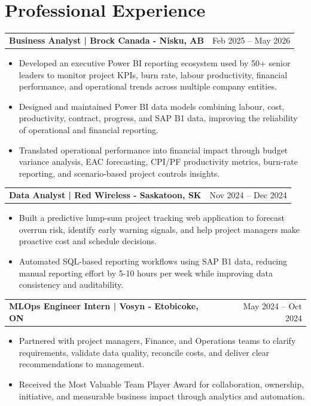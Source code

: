 \documentclass[10.5pt,letterpaper]{article}
\makeatletter
\newcommand{\resumeRow}[2]{%
  \noindent\begin{tabularx}{\linewidth}{@{}X r@{}}
    \textbf{#1} & #2 \\
  \end{tabularx}%
}
\makeatother
\begin{document}
\section{Professional Experience}
\resumeRow{Business Analyst | Brock Canada - Nisku, AB}{Feb 2025 -- May 2026}
\begin{itemize}
  \item Developed an executive Power BI reporting ecosystem used by 50+ senior leaders to monitor project KPIs, burn rate, labour productivity, financial performance, and operational trends across multiple company entities.
  \item Designed and maintained Power BI data models combining labour, cost, productivity, contract, progress, and SAP B1 data, improving the reliability of operational and financial reporting.
  \item Translated operational performance into financial impact through budget variance analysis, EAC forecasting, CPI/PF productivity metrics, burn-rate reporting, and scenario-based project controls insights.
\end{itemize}
\resumeRow{Data Analyst | Red Wireless - Saskatoon, SK}{Nov 2024 -- Dec 2024}
\begin{itemize}
  \item Built a predictive lump-sum project tracking web application to forecast overrun risk, identify early warning signals, and help project managers make proactive cost and schedule decisions.
  \item Automated SQL-based reporting workflows using SAP B1 data, reducing manual reporting effort by 5-10 hours per week while improving data consistency and auditability.
\end{itemize}
\resumeRow{MLOps Engineer Intern | Vosyn - Etobicoke, ON}{May 2024 -- Oct 2024}
\begin{itemize}
  \item Partnered with project managers, Finance, and Operations teams to clarify requirements, validate data quality, reconcile costs, and deliver clear recommendations to management.
  \item Received the Most Valuable Team Player Award for collaboration, ownership, initiative, and measurable business impact through analytics and automation.
\end{itemize}
\end{document}
